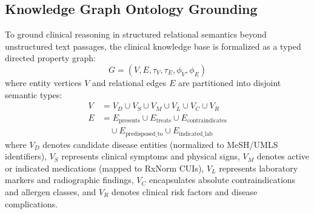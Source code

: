 \documentclass[journal,10pt,twocolumn]{IEEEtran}
\begin{document}
\subsection{Knowledge Graph Ontology Grounding}
To ground clinical reasoning in structured relational semantics beyond unstructured text passages, the clinical knowledge base is formalized as a typed directed property graph:
\begin{equation}
G = (V, E, \tau_V, \tau_E, \phi_V, \phi_E)
\end{equation}
where entity vertices $V$ and relational edges $E$ are partitioned into disjoint semantic types:
\begin{align}
V &= V_D \cup V_S \cup V_M \cup V_L \cup V_C \cup V_R \\
E &= E_{\text{presents}} \cup E_{\text{treats}} \cup E_{\text{contraindicates}} \nonumber \\
  &\quad \cup E_{\text{predisposed\_to}} \cup E_{\text{indicated\_lab}}
\end{align}
where $V_D$ denotes candidate disease entities (normalized to MeSH/UMLS identifiers), $V_S$ represents clinical symptoms and physical signs, $V_M$ denotes active or indicated medications (mapped to RxNorm CUIs), $V_L$ represents laboratory markers and radiographic findings, $V_C$ encapsulates absolute contraindications and allergen classes, and $V_R$ denotes clinical risk factors and disease complications.
\end{document}
